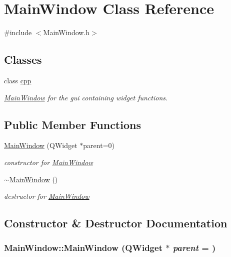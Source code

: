 \hypertarget{classMainWindow}{
\section{MainWindow Class Reference}
\label{classMainWindow}
}


{\ttfamily \#include $<$MainWindow.h$>$}\subsection*{Classes}
\begin{DoxyCompactItemize}
\item 
class \hyperlink{classMainWindow_1_1cpp}{cpp}
\begin{DoxyCompactList}\small\item\em \hyperlink{classMainWindow}{MainWindow} for the gui containing widget functions. \item\end{DoxyCompactList}\end{DoxyCompactItemize}
\subsection*{Public Member Functions}
\begin{DoxyCompactItemize}
\item 
\hyperlink{classMainWindow_a8b244be8b7b7db1b08de2a2acb9409db}{MainWindow} (QWidget $\ast$parent=0)
\begin{DoxyCompactList}\small\item\em constructor for \hyperlink{classMainWindow}{MainWindow} \item\end{DoxyCompactList}\item 
\hyperlink{classMainWindow_ae98d00a93bc118200eeef9f9bba1dba7}{$\sim$MainWindow} ()
\begin{DoxyCompactList}\small\item\em destructor for \hyperlink{classMainWindow}{MainWindow} \item\end{DoxyCompactList}\end{DoxyCompactItemize}


\subsection{Constructor \& Destructor Documentation}
\hypertarget{classMainWindow_a8b244be8b7b7db1b08de2a2acb9409db}{
\subsubsection[{MainWindow}]{\setlength{\rightskip}{0pt plus 5cm}MainWindow::MainWindow (QWidget $\ast$ {\em parent} = {})}}
\label{classMainWindow_a8b244be8b7b7db1b08de2a2acb9409db}


